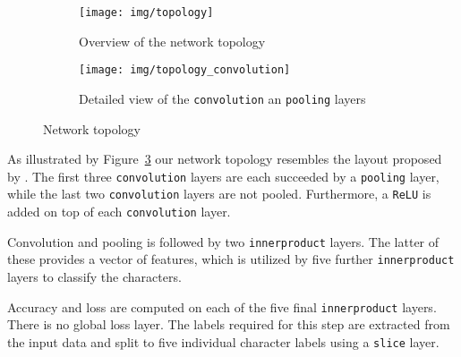 \begin{figure}
	\centering
	\begin{subfigure}[t]{0.48\textwidth}
    	\texttt{[image: img/topology]}
    	\caption{Overview of the network topology} 
        \label{fig:topology_overview} \end{subfigure}
	\begin{subfigure}[t]{0.48\textwidth}
    	\texttt{[image: img/topology\_convolution]} 
        \caption{Detailed view of the \texttt{convolution} an \texttt{pooling} layers} 		
        \label{fig:topology_convolution} 
	\end{subfigure}
    \caption{Network topology}
    \label{fig:topology}
\end{figure}
As illustrated by Figure~\ref{fig:topology} our network topology resembles the layout proposed by \cite{jaderberg_deep_2014}.
The first three \texttt{convolution} layers are each succeeded by a \texttt{pooling} layer, while the last two \texttt{convolution} layers are not pooled. 
Furthermore, a \texttt{ReLU} is added on top of each \texttt{convolution} layer.

Convolution and pooling is followed by two \texttt{innerproduct} layers.
The latter of these provides a vector of features, which is utilized by five further \texttt{innerproduct} layers to classify the characters.

Accuracy and loss are computed on each of the five final \texttt{innerproduct} layers.
There is no global loss layer.
The labels required for this step are extracted from the input data and split to five individual character labels using a \texttt{slice} layer.